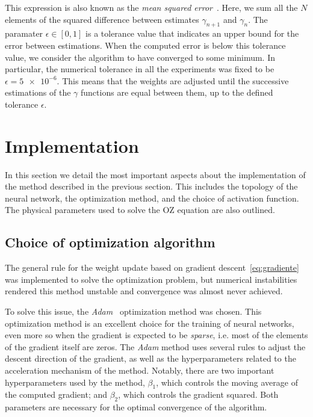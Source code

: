 This expression is also known as the \emph{mean squared error}~\cite{goodfellowDeepLearning2016}.
Here, we sum all the $N$ elements of the squared difference between estimates $\gamma_{n+1}$
and $\gamma_{n}$. The paramater $\epsilon \in [0,1]$ is a tolerance value that indicates an 
upper bound for the error between estimations. When the computed error is below this 
tolerance value, we consider the algorithm to have converged to some minimum.
In particular, the numerical tolerance in all the experiments was fixed to be
$\epsilon = \num{5e-6}$.
This means that the weights are adjusted until the successive estimations of the $\gamma$
functions are equal between them, up to the defined tolerance $\epsilon$.

\section{Implementation}
In this section we detail the most important aspects about the implementation of the
method described in the previous section. This includes the topology of the neural network,
the optimization method, and the choice of activation function. The physical parameters used
to solve the OZ equation are also outlined.

\subsection{Choice of optimization algorithm}
The general rule for the weight update based on gradient descent~\eqref{eq:gradiente} was
implemented to solve the optimization problem, but numerical instabilities rendered this 
method unstable and convergence was almost never achieved.

To solve this issue, the \emph{Adam}~\cite{kingmaAdamMethodStochastic2017} optimization 
method was chosen. This optimization method is an excellent choice for the training
of neural networks, even more so when the gradient is expected to be \emph{sparse}, i.e.
most of the elements of the gradient itself are zeros.
The \emph{Adam} method uses several rules to adjust the descent direction of the gradient,
as well as the hyperparameters related to the acceleration mechanism of the method.
Notably, there are two important hyperparameters used by the method, $\beta_1$,
which controls the moving average of the computed gradient; and $\beta_2$, which controls
the gradient squared. Both parameters are necessary for the optimal convergence of the
algorithm.

